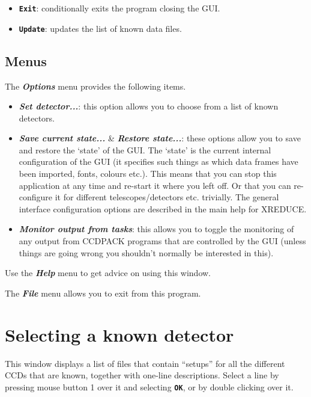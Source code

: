 \documentclass[11pt]{article}
\newcommand{\xref}[3]{#1}
\newcommand{\xlabel}[1]{}
\newcommand{\butt}[1]{{\bf \tt #1}}
\newcommand{\menu}[1]{{\bf \em #1}}
\begin{document}
\begin{itemize}
\item \butt{Exit}: conditionally exits the program closing the GUI.
\item \butt{Update}: updates the list of known data files.
\end{itemize}

\subsection{Menus \xlabel{CCDMainMenu} \label{CCDMainMenu}}
The \menu{Options} menu provides the following items.

\begin{itemize}
\item \menu{Set detector...}:
this option allows you to choose from a list of known detectors.

\item \menu{Save current state...} \& \menu{Restore state...}:
these options allow you to save and restore the `state' of the GUI.
The `state' is the current internal configuration of the GUI (it
specifies such things as which data frames have been imported, fonts,
colours etc.). This means that you can stop this application at any
time and re-start it where you left off. Or that you can re-configure
it for different telescopes/detectors etc. trivially.  The general
interface configuration options are described in the main help for
\xref{XREDUCE}{sun139}{XREDUCE}.

\item \menu{Monitor output from tasks}:
this allows you to toggle the monitoring of any output from CCDPACK
programs that are controlled by the GUI (unless things are going wrong
you shouldn't normally be interested in this).
\end{itemize}

Use the \menu{Help} menu to get advice on using this window.

The \menu{File} menu allows you to exit from this program.


\section{Selecting a known detector \xlabel{CCDSetDetectorWindow}
         \label{CCDSetDetectorWindow}}
This window displays a list of files that contain ``setups'' for
all the different CCDs that are known, together with one-line
descriptions. Select a line by pressing mouse button 1 over it
and selecting \butt{OK}, or by double clicking over it.
\end{document}
